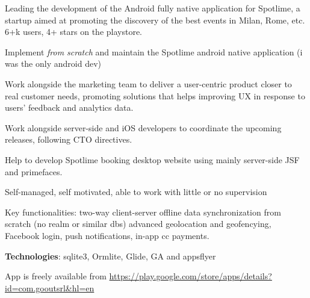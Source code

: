 \begin{cventries}
{\begin{cvitems}
	\item Leading the 
   development of the 
   Android fully native application for 
   Spotlime, a startup aimed  at promoting  the 
   discovery of the best events in Milan, Rome, etc. 6+k users,  4+ stars on the playstore. 
      \item Implement \emph{from scratch} and maintain the Spotlime android
	      native application (i was the only android dev)
      \item 
   Work alongside the marketing team to deliver a user-centric product closer
   to real customer 
   needs, promoting solutions that helps improving UX in response
   to users' feedback and analytics data.
      \item 
   Work alongside server-side and iOS developers to coordinate the upcoming
   releases, following CTO directives.
\item Help to develop Spotlime booking desktop website using mainly server-side JSF and
   primefaces.
      \item Self-managed, self motivated, able to work with little or no supervision
\item Key functionalities: two-way  
  client-server offline data synchronization from scratch (no realm or similar dbs)
   advanced geolocation and geofencying, Facebook login, push notifications, in-app cc payments.
\item \textbf{Technologies}: sqlite3, Ormlite, Glide, GA and appsflyer
   \item App is freely available from 
   \url{https://play.google.com/store/apps/details?id=com.gooutsrl&hl=en}
	\end{cvitems}
}


\end{cventries}
